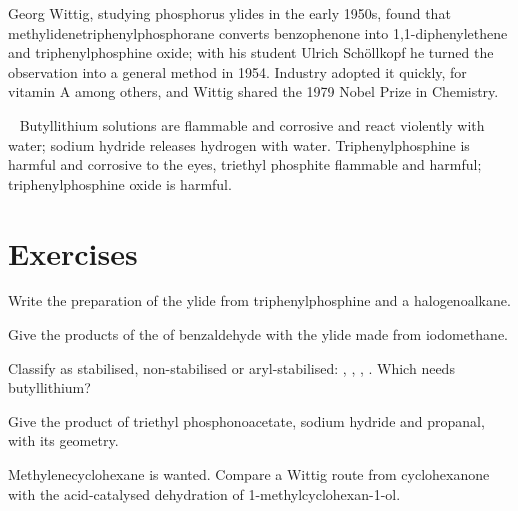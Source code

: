 \begin{history}
Georg Wittig, studying phosphorus ylides in the early 1950s, found that methylidenetriphenylphosphorane
converts benzophenone into 1,1-diphenylethene and triphenylphosphine oxide; with his student Ulrich
Schöllkopf he turned the observation into a general method in 1954. Industry adopted it quickly, for
vitamin A among others, and Wittig shared the 1979 Nobel Prize in Chemistry.
\end{history}

\begin{safety}{\,\,\,}
Butyllithium solutions are flammable and corrosive and react violently with water; sodium hydride
releases hydrogen with water. Triphenylphosphine is harmful and corrosive to the eyes, triethyl
phosphite flammable and harmful; triphenylphosphine oxide is harmful.
\end{safety}

\section{Exercises}

\begin{exercise}[$\star$]\label{exo:b2:wittig:1}
Write the preparation of the ylide  from triphenylphosphine and a halogenoalkane.
\end{exercise}

\begin{exercise}[$\star$]\label{exo:b2:wittig:2}
Give the products of the  of benzaldehyde with the ylide made from iodomethane.
\end{exercise}

\begin{exercise}[$\star$]\label{exo:b2:wittig:3}
Classify as stabilised, non-stabilised or aryl-stabilised: , ,
, . Which needs butyllithium?
\end{exercise}

\begin{exercise}[$\star$]\label{exo:b2:wittig:4}
Give the product of triethyl phosphonoacetate, sodium hydride and propanal, with its geometry.
\end{exercise}

\begin{exercise}[$\star\star$]\label{exo:b2:wittig:5}
Methylenecyclohexane is wanted. Compare a Wittig route from cyclohexanone with the acid-catalysed
dehydration of 1-methylcyclohexan-1-ol.
\end{exercise}

